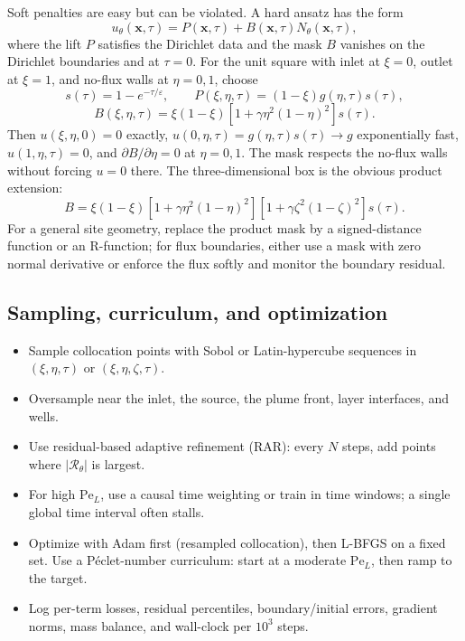 \documentclass[11pt]{article}
\newcommand{\Pe}{\mathrm{Pe}}
\newcommand{\RR}{\mathcal{R}}
\newcommand{\xx}{\mathbf{x}}
\newcommand{\abs}[1]{\left\lvert #1 \right\rvert}
\begin{document}
Soft penalties are easy but can be violated.  A hard ansatz has the form
\begin{equation}
\label{eq:hard}
u_\theta(\xx,\tau)=P(\xx,\tau)+B(\xx,\tau)N_\theta(\xx,\tau),
\end{equation}
where the lift $P$ satisfies the Dirichlet data and the mask $B$ vanishes on
the Dirichlet boundaries and at $\tau=0$.  For the unit square with inlet at
$\xi=0$, outlet at $\xi=1$, and no-flux walls at $\eta=0,1$, choose
\begin{equation}
\label{eq:hard2d}
s(\tau)=1-e^{-\tau/\varepsilon},\qquad
P(\xi,\eta,\tau)=(1-\xi)g(\eta,\tau)s(\tau),
\end{equation}
\begin{equation}
\label{eq:hard2dB}
B(\xi,\eta,\tau)=\xi(1-\xi)\left[1+\gamma\eta^2(1-\eta)^2\right]s(\tau).
\end{equation}
Then $u(\xi,\eta,0)=0$ exactly, $u(0,\eta,\tau)=g(\eta,\tau)s(\tau)\to g$
exponentially fast, $u(1,\eta,\tau)=0$, and
$\partial B/\partial\eta=0$ at $\eta=0,1$.  The mask respects the no-flux
walls without forcing $u=0$ there.  The three-dimensional box is the obvious
product extension:
\begin{equation}
\label{eq:hard3dB}
B=\xi(1-\xi)\left[1+\gamma\eta^2(1-\eta)^2\right]
\left[1+\gamma\zeta^2(1-\zeta)^2\right]s(\tau).
\end{equation}
For a general site geometry, replace the product mask by a signed-distance
function or an R-function; for flux boundaries, either use a mask with zero
normal derivative or enforce the flux softly and monitor the boundary residual.

\subsection{Sampling, curriculum, and optimization}

\begin{itemize}[leftmargin=1.6em,itemsep=2pt]
  \item Sample collocation points with Sobol or Latin-hypercube sequences in
        $(\xi,\eta,\tau)$ or $(\xi,\eta,\zeta,\tau)$.
  \item Oversample near the inlet, the source, the plume front, layer
        interfaces, and wells.
  \item Use residual-based adaptive refinement (RAR): every $N$ steps, add
        points where $\abs{\RR_\theta}$ is largest.
  \item For high $\Pe_L$, use a causal time weighting or train in time
        windows; a single global time interval often stalls.
  \item Optimize with Adam first (resampled collocation), then L-BFGS on a
        fixed set.  Use a P\'eclet-number curriculum: start at a moderate
        $\Pe_L$, then ramp to the target.
  \item Log per-term losses, residual percentiles, boundary/initial errors,
        gradient norms, mass balance, and wall-clock per $10^3$ steps.
\end{itemize}
\end{document}
